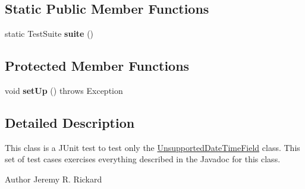 \subsection*{Static Public Member Functions}
\begin{DoxyCompactItemize}
\item 
\hypertarget{classorg_1_1joda_1_1time_1_1field_1_1_test_unsupported_date_time_field_a1d9a5180b9673f148acb9f742d70107e}{static Test\-Suite {\bfseries suite} ()}\label{classorg_1_1joda_1_1time_1_1field_1_1_test_unsupported_date_time_field_a1d9a5180b9673f148acb9f742d70107e}

\end{DoxyCompactItemize}
\subsection*{Protected Member Functions}
\begin{DoxyCompactItemize}
\item 
\hypertarget{classorg_1_1joda_1_1time_1_1field_1_1_test_unsupported_date_time_field_a2ff58520dbed9bf9896a4dfbca5d11e9}{void {\bfseries set\-Up} ()  throws Exception }\label{classorg_1_1joda_1_1time_1_1field_1_1_test_unsupported_date_time_field_a2ff58520dbed9bf9896a4dfbca5d11e9}

\end{DoxyCompactItemize}


\subsection{Detailed Description}
This class is a J\-Unit test to test only the \hyperlink{classorg_1_1joda_1_1time_1_1field_1_1_unsupported_date_time_field}{Unsupported\-Date\-Time\-Field} class. This set of test cases exercises everything described in the Javadoc for this class.

\begin{DoxyAuthor}{Author}
Jeremy R. Rickard 
\end{DoxyAuthor}


